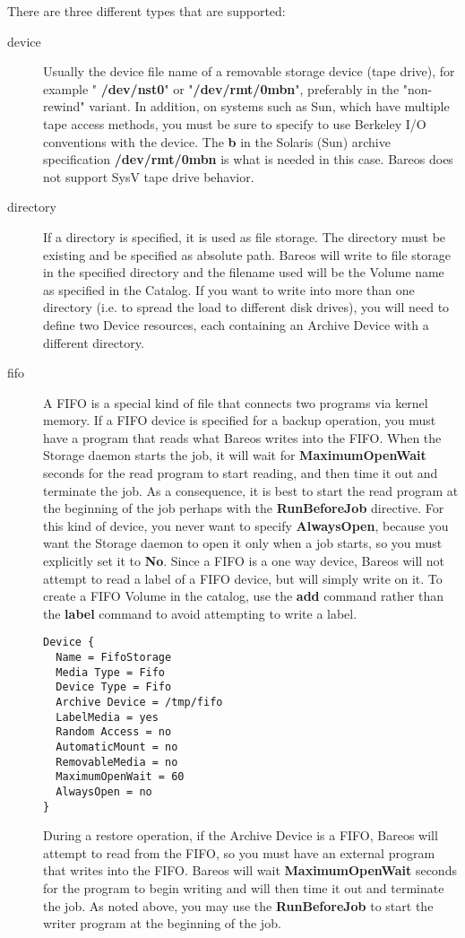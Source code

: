 \begin{description}
There are three different types that are supported:
\begin{description}
    \item[device] Usually the device file
name of a removable storage device (tape drive),  for example "{\bf
/dev/nst0}" or "{\bf /dev/rmt/0mbn}", preferably in the "non-rewind" variant.
In addition, on systems such as Sun, which have multiple tape
access methods, you must be sure to specify to use Berkeley I/O
conventions with the device.  The {\bf b} in the Solaris (Sun) archive
specification {\bf /dev/rmt/0mbn} is what is needed in this case.
Bareos does not support SysV tape drive behavior.
    \item[directory] If a directory is specified, it is used as file storage.
The directory must be existing and be specified as absolute path.
Bareos will write to file storage in the specified
directory and the filename used will be the Volume name as specified in the
Catalog.  If you want to write into more than one directory (i.e.  to spread
the load to different disk drives), you will need to define two Device
resources, each containing an Archive Device with a different directory.
    \item[fifo] \label{SetupFifo}
A FIFO is a special kind of file that  connects two programs
via kernel memory. If a FIFO device is specified  for a backup operation, you
must have a program that reads what Bareos  writes into the FIFO. When the
Storage daemon starts the job, it  will wait for {\bf MaximumOpenWait} seconds
for the read program to start reading, and then time it out and  terminate
the job. As a consequence, it is best to start the read  program at the
beginning of the job perhaps with the {\bf RunBeforeJob}  directive. For this
kind of device, you never want to specify  {\bf AlwaysOpen}, because you want
the Storage daemon to open it only  when a job starts, so you must explicitly
set it to {\bf No}.  Since a FIFO is a one way device, Bareos will not attempt
to read  a label of a FIFO device, but will simply write on it. To create a
FIFO Volume in the catalog, use the {\bf add} command rather than the {\bf
label} command to avoid attempting to write a label.
{
\footnotesize
\begin{verbatim}
Device {
  Name = FifoStorage
  Media Type = Fifo
  Device Type = Fifo
  Archive Device = /tmp/fifo
  LabelMedia = yes
  Random Access = no
  AutomaticMount = no
  RemovableMedia = no
  MaximumOpenWait = 60
  AlwaysOpen = no
}
\end{verbatim}
}
During a restore operation, if the Archive Device is a FIFO, Bareos  will
attempt to read from the FIFO, so you must have an external program  that
writes into the FIFO. Bareos will wait {\bf MaximumOpenWait} seconds  for the
program to begin writing and will then time it out and  terminate the job. As
noted above, you may use the {\bf RunBeforeJob}  to start the writer program
at the beginning of the job.
\end{description}



\end{description}
